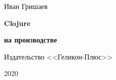 
\begin{titlepage}

\begin{center}

  {Иван Гришаев}

  \vspace*{5cm}

  {\Huge\textbf{Clojure}}

  \vspace{1mm}

  {\Large\textbf{на производстве}}

  \vspace*{\fill}

  {Издательство <<Геликон-Плюс>>}

  {2020}

\end{center}

\end{titlepage}
